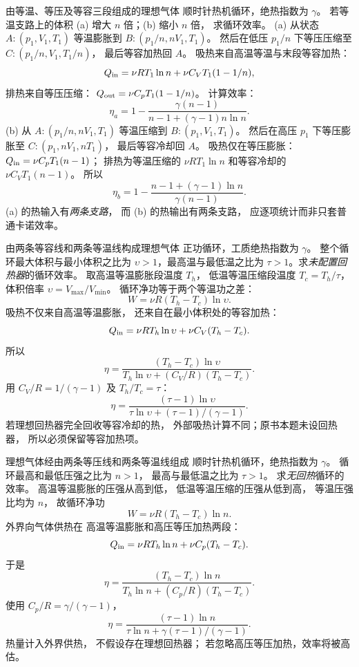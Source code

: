 由等温、等压及等容三段组成的理想气体
顺时针热机循环，绝热指数为 $\gamma$。
若等温支路上的体积
(a) 增大 $n$ 倍；(b) 缩小 $n$ 倍，
求循环效率。
\exsolution
(a) 从状态
$A:(p_1,V_1,T_1)$ 等温膨胀到
$B:(p_1/n,nV_1,T_1)$。
然后在低压 $p_1/n$ 下等压压缩至
$C:(p_1/n,V_1,T_1/n)$，
最后等容加热回 $A$。
吸热来自高温等温与末段等容加热：
\[
Q_{\rm in}=\nu RT_1\ln n+
\nu C_VT_1(1-1/n),
\]
排热来自等压压缩：
$Q_{\rm out}=\nu C_pT_1(1-1/n)$。
计算效率：
\[
\boxed{\eta_a=
1-\frac{\gamma(n-1)}
{n-1+(\gamma-1)n\ln n}}.
\]
(b) 从
$A:(p_1/n,nV_1,T_1)$
等温压缩到
$B:(p_1,V_1,T_1)$。
然后在高压 $p_1$ 下等压膨胀至
$C:(p_1,nV_1,nT_1)$，
最后等容冷却回 $A$。
吸热仅在等压膨胀：
$Q_{\rm in}=\nu C_pT_1(n-1)$；
排热为等温压缩的
$\nu RT_1\ln n$ 和等容冷却的
$\nu C_VT_1(n-1)$。
所以
\[
\boxed{\eta_b=
1-\frac{n-1+(\gamma-1)\ln n}
{\gamma(n-1)}}.
\]
\excheck (a) 的热输入有\emph{两条支路}，
而 (b) 的热输出有两条支路，
应逐项统计而非只套普通卡诺效率。

由两条等容线和两条等温线构成理想气体
正功循环，工质绝热指数为 $\gamma$。
整个循环最大体积与最小体积之比为
$\upsilon>1$，最高温与最低温之比为
$\tau>1$。求\emph{未配置回热器}的循环效率。
\exsolution
取高温等温膨胀段温度 $T_h$，
低温等温压缩段温度 $T_c=T_h/\tau$，
体积倍率
$\upsilon=V_{\max}/V_{\min}$。
循环净功等于两个等温功之差：
\[
W=\nu R(T_h-T_c)\ln\upsilon.
\]
吸热不仅来自高温等温膨胀，
还来自在最小体积处的等容加热：
\[
Q_{\rm in}=\nu RT_h\ln\upsilon+
\nu C_V(T_h-T_c).
\]
所以
\[
\eta=
\frac{(T_h-T_c)\ln\upsilon}
{T_h\ln\upsilon+(C_V/R)(T_h-T_c)}.
\]
用 $C_V/R=1/(\gamma-1)$ 及
$T_h/T_c=\tau$：
\[
\boxed{\eta=
\frac{(\tau-1)\ln\upsilon}
{\tau\ln\upsilon+(\tau-1)/(\gamma-1)}}.
\]
\excheck 若理想回热器完全回收等容冷却的热，
外部吸热计算不同；原书本题未设回热器，
所以必须保留等容加热项。

理想气体经由两条等压线和两条等温线组成
顺时针热机循环，绝热指数为 $\gamma$。
循环最高和最低压强之比为 $n>1$，
最高与最低温之比为 $\tau>1$。
求\emph{无回热}循环的效率。
\exsolution
高温等温膨胀的压强从高到低，
低温等温压缩的压强从低到高，
等温压强比均为 $n$，
故循环净功
\[
W=\nu R(T_h-T_c)\ln n.
\]
外界向气体供热在
高温等温膨胀和高压等压加热两段：
\[
Q_{\rm in}=\nu RT_h\ln n+
\nu C_p(T_h-T_c).
\]
于是
\[
\eta=\frac{(T_h-T_c)\ln n}
{T_h\ln n+(C_p/R)(T_h-T_c)}.
\]
使用
$C_p/R=\gamma/(\gamma-1)$，
\[
\boxed{\eta=
\frac{(\tau-1)\ln n}
{\tau\ln n+\gamma(\tau-1)/(\gamma-1)}}.
\]
\excheck 热量计入外界供热，
不假设存在理想回热器；
若忽略高压等压加热，效率将被高估。

